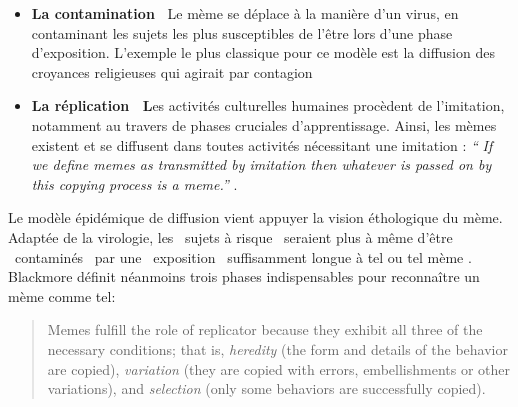 \begin{itemize}
\item
\textbf{La contamination~\newline
}Le m\`eme se d\'eplace \`a la mani\`ere d{\textquoteright}un virus, en contaminant les sujets les plus susceptibles de l{\textquoteright}\^etre lors d{\textquoteright}une phase d{\textquoteright}exposition. L{\textquoteright}exemple le plus classique pour ce mod\`ele est la diffusion des croyances religieuses
qui agirait par contagion \citep{Dennett2006}
\item
\textbf{La r\'eplication~\newline
L}es activit\'es culturelles humaines proc\`edent de l{\textquoteright}imitation, notamment au travers de phases cruciales d{\textquoteright}apprentissage. Ainsi, les m\`emes existent et se diffusent dans toutes activit\'es n\'ecessitant une imitation : \textit{{\textquotedblleft}} \textit{If we define memes as transmitted by imitation then whatever is passed on by this copying process is a meme.{\textquotedblright} }\citep{Blackmore2006}. 
\end{itemize}

Le mod\`ele \'epid\'emique de diffusion vient appuyer la vision \'ethologique du m\`eme. Adapt\'ee de la virologie, les {\guillemotleft}~sujets \`a risque~{\guillemotright} seraient plus \`a m\^eme d{\textquoteright}\^etre {\guillemotleft}~contamin\'es~{\guillemotright} par une {\guillemotleft}~exposition~{\guillemotright} suffisamment longue \`a tel ou tel m\`eme \citep{Wang2011}. Blackmore d\'efinit n\'eanmoins trois phases indispensables pour reconna\^itre un m\`eme comme tel:  

\begin{quote}
Memes fulfill the role of replicator because they exhibit all three of the necessary conditions; that is, \textit{heredity} (the form and details of the behavior are copied), \textit{variation} (they are copied with errors, embellishments or other variations), and \textit{selection} (only some behaviors are
successfully copied). \citep{Blackmore2006}
\end{quote}

